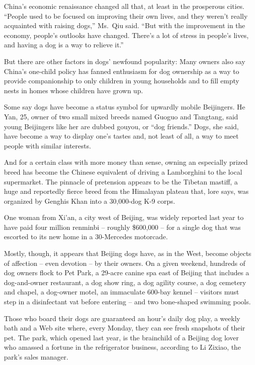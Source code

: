 ﻿\documentclass[12pt]{article}
\begin{document}
China's economic renaissance changed all that, at least in the prosperous cities. ``People used to
be focused on improving their own lives, and they weren't really acquainted with raising dogs,''
Ms.~Qiu said. ``But with the improvement in the economy, people's outlooks have changed. There's a
lot of stress in people's lives, and having a dog is a way to relieve it.''

But there are other factors in dogs' newfound popularity: Many owners also say China's one-child
policy has fanned enthusiasm for dog ownership as a way to provide companionship to only children in
young households and to fill empty nests in homes whose children have grown up.

Some say dogs have become a status symbol for upwardly mobile Beijingers. He Yan, 25, owner of two
small mixed breeds named Guoguo and Tangtang, said young Beijingers like her are dubbed gouyou, or
``dog friends.'' Dogs, she said, have become a way to display one's tastes and, not least of all, a
way to meet people with similar interests.

And for a certain class with more money than sense, owning an especially prized breed has become the
Chinese equivalent of driving a Lamborghini to the local supermarket. The pinnacle of pretension
appears to be the Tibetan mastiff, a huge and reportedly fierce breed from the Himalayan plateau
that, lore says, was organized by Genghis Khan into a 30,000-dog K-9 corps.

One woman from Xi'an, a city west of Beijing, was widely reported last year to have paid four
million renminbi -- roughly \$600,000 -- for a single dog that was escorted to its new home in a
30-Mercedes motorcade.

Mostly, though, it appears that Beijing dogs have, as in the West, become objects of affection --
even devotion -- by their owners. On a given weekend, hundreds of dog owners flock to Pet Park, a
29-acre canine spa east of Beijing that includes a dog-and-owner restaurant, a dog show ring, a dog
agility course, a dog cemetery and chapel, a dog-owner motel, an immaculate 600-bay kennel --
visitors must step in a disinfectant vat before entering -- and two bone-shaped swimming pools.

Those who board their dogs are guaranteed an hour's daily dog play, a weekly bath and a Web site
where, every Monday, they can see fresh snapshots of their pet. The park, which opened last year, is
the brainchild of a Beijing dog lover who amassed a fortune in the refrigerator business, according
to Li Zixiao, the park's sales manager.
\end{document}
